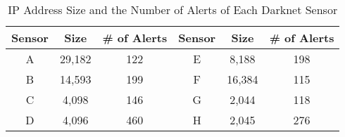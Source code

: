 \documentclass[conference]{IEEEtran}
\begin{document}
\begin{table}[tb]
  \begin{center}
    \caption{IP Address Size and the Number of Alerts of Each Darknet Sensor}
  \begin{tabular}{c|c|c||c|c|c} \hline
  Sensor & Size & \# of Alerts & Sensor & Size & \# of Alerts \\ \hline\hline
  A & 29,182 & 122 & E & 8,188 & 198 \\ \hline
  B & 14,593 & 199 & F & 16,384 & 115 \\ \hline
  C & 4,098 & 146 & G & 2,044 & 118 \\ \hline
  D & 4,096 & 460 & H & 2,045 & 276 \\ \hline
  \end{tabular}
  \label{tab:sensor}
  \end{center}
\end{table}
\end{document}
